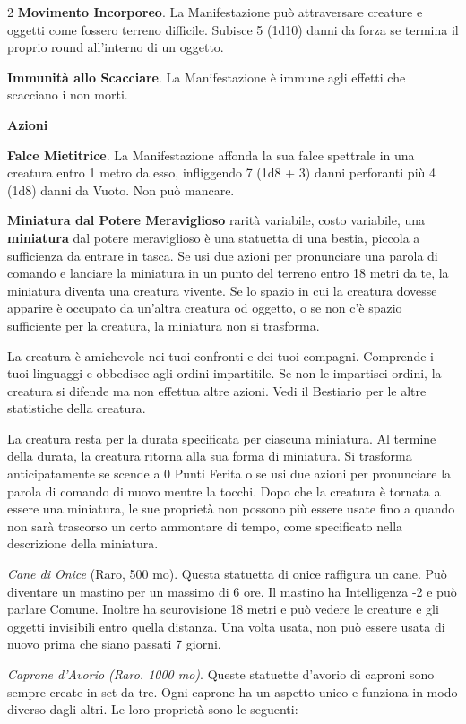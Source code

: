 \begin{multicols}{2}
\textbf{Movimento Incorporeo}. La Manifestazione può attraversare creature e oggetti come fossero terreno difficile. Subisce 5 (1d10) danni da forza se termina il proprio round all'interno di un oggetto.

\textbf{Immunità allo Scacciare}. La Manifestazione è immune agli effetti che scacciano i non morti.

\textbf{Azioni}

\textbf{Falce Mietitrice}. La Manifestazione affonda la sua falce spettrale in una creatura entro 1 metro da esso, infliggendo 7 (1d8 + 3) danni perforanti più 4 (1d8) danni da Vuoto. Non può mancare.

\smallskip*\hypertarget{Miniatura dal Potere Meraviglioso}{} \textbf{Miniatura dal Potere Meraviglioso} rarità variabile, costo variabile, una \textbf{miniatura} dal potere meraviglioso è una statuetta di una bestia, piccola a sufficienza da entrare in tasca. Se usi due azioni per pronunciare una parola di comando e lanciare la miniatura in un punto del terreno entro 18 metri da te, la miniatura diventa una creatura vivente. Se lo spazio in cui la creatura dovesse apparire è occupato da un'altra creatura od oggetto, o se non c'è spazio sufficiente per la creatura, la miniatura non si trasforma.

La creatura è amichevole nei tuoi confronti e dei tuoi compagni. Comprende i tuoi linguaggi e obbedisce agli ordini impartitile. Se non le impartisci ordini, la creatura si difende ma non effettua altre azioni. Vedi il Bestiario per le altre statistiche della creatura.

La creatura resta per la durata specificata per ciascuna miniatura. Al termine della durata, la creatura ritorna alla sua forma di miniatura. Si trasforma anticipatamente se scende a 0 Punti Ferita o se usi due azioni per pronunciare la parola di comando di nuovo mentre la tocchi. Dopo che la creatura è tornata a essere una miniatura, le sue proprietà non possono più essere usate fino a quando non sarà trascorso un certo ammontare di tempo, come specificato nella descrizione della miniatura.

\emph{Cane di Onice} (Raro, 500 mo). Questa statuetta di onice raffigura un cane. Può diventare un mastino per un massimo di 6 ore. Il mastino ha Intelligenza -2 e può parlare Comune. Inoltre ha scurovisione 18 metri e può vedere le creature e gli oggetti invisibili entro quella distanza. Una volta usata, non può essere usata di nuovo prima che siano passati 7 giorni.

\emph{Caprone d'Avorio (Raro. 1000 mo)}. Queste statuette d'avorio di caproni sono sempre create in set da tre. Ogni caprone ha un aspetto unico e funziona in modo diverso dagli altri. Le loro proprietà sono le seguenti:


\end{multicols}
